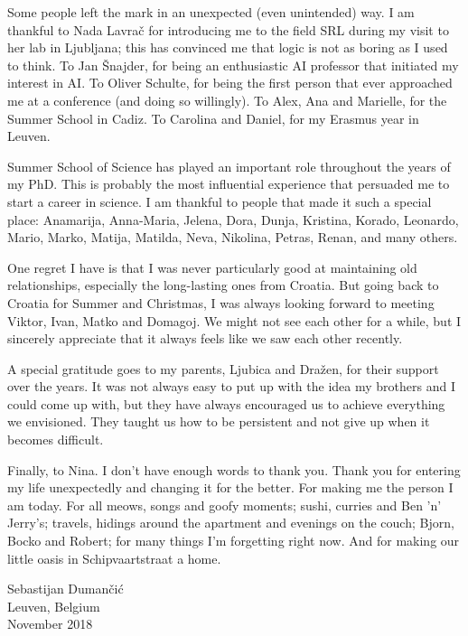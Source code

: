 Some people left the mark in an unexpected (even unintended) way.
I am thankful to Nada Lavrač for introducing me to the field SRL during my visit to her lab in Ljubljana; this has convinced me that logic is not as boring as I used to think.
To Jan Šnajder, for being an enthusiastic AI professor that initiated my interest in AI.
To Oliver Schulte, for being the first person that ever approached me at a conference (and doing so willingly).
To Alex, Ana and Marielle, for the Summer School in Cadiz.
To Carolina and Daniel, for my Erasmus year in Leuven.




Summer School of Science has played an important role throughout the years of my PhD.
This is probably the most influential experience that persuaded me to start a career in science.
I am thankful to people that made it such a special place: Anamarija, Anna-Maria, Jelena, Dora, Dunja, Kristina, Korado, Leonardo,  Mario, Marko, Matija, Matilda, Neva, Nikolina, Petras, Renan, and many others.





One regret I have is that I was never particularly good at maintaining old relationships, especially the long-lasting ones from Croatia.
But going back to Croatia for Summer and Christmas, I was always looking forward to meeting Viktor, Ivan, Matko and Domagoj.
We might not see each other for a while, but I sincerely appreciate that it always feels like we saw each other recently.




A special gratitude goes to my parents, Ljubica and Dražen, for their support over the years.
It was not always easy to put up with the idea my brothers and I could come up with, but they have always encouraged us to achieve everything we envisioned.
They taught us how to be persistent and not give up when it becomes difficult.



Finally, to Nina.
I don't have enough words to thank you.
Thank you for entering my life unexpectedly and changing it for the better.
For making me the person I am today.
For all meows, songs and goofy moments; sushi, curries and Ben 'n' Jerry's; travels, hidings around the apartment and evenings on the couch; Bjorn, Bocko and Robert; for many things I'm forgetting right now.
And for making our little oasis in Schipvaartstraat a home.



\begin{flushright}
  Sebastijan Dumančić \\
  Leuven, Belgium \\
  November 2018
\end{flushright}















\cleardoublepage

